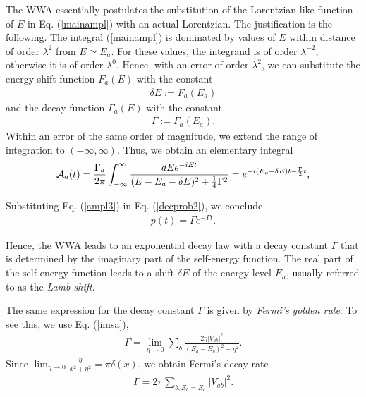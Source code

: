 \documentclass[12pt]{article}
\numberwithin{equation}{section}
\begin{document}
The WWA essentially postulates the substitution of the Lorentzian-like function of $E$ in Eq. (\ref{mainampl}) with an actual Lorentzian. The justification is the following.  The integral (\ref{mainampl}) is dominated by values of $E$  within distance of order $\lambda^2$ from  $E \simeq E_a$. For these values, the integrand is of order $\lambda^{-2}$, otherwise it is of order $\lambda^0$.   Hence, with an error of order $\lambda^2$,
 we   can substitute the energy-shift function $F_a(E)$ with the constant
\begin{eqnarray}
\delta E := F_a(E_a)
\end{eqnarray}
 and the decay function $\Gamma_a(E)$ with the constant
 \begin{eqnarray}
 \Gamma  := \Gamma_a(E_a).
 \end{eqnarray}
 Within an error of the same order of magnitude,
 we extend the range of integration to $(-\infty, \infty)$. Thus, we  obtain an elementary integral
\begin{eqnarray}
{\cal A}_a(t) =  \frac{\Gamma_a}{2 \pi }  \int_{-\infty}^{\infty } \frac{dE   e^{-iEt}}{ (E - E_a -  \delta E )^2 + \frac{1}{4}\Gamma^2} =  e^{ -i (E_a +\delta E ) t - \frac{\Gamma }{2}t},  \label{ampl3}
\end{eqnarray}


 Substituting Eq.  (\ref{ampl3}) in Eq. (\ref{decprob2}), we conclude
\begin{eqnarray}
p(t) = \Gamma  e^{-\Gamma t}.
\end{eqnarray}

 Hence, the WWA leads to an exponential decay law with a decay constant $\Gamma $ that is determined by the imaginary part of the self-energy function. The real part of the self-energy function leads to a shift
 $\delta E $ of the energy level $E_a$, usually referred to as the {\em Lamb shift}.




 The same expression for the decay constant $\Gamma $ is  given by {\em Fermi's golden rule}. To see this, we use
Eq. (\ref{imsa}),
\begin{eqnarray}
\Gamma  =  \lim_{\eta \rightarrow 0} \sum_b \frac{2\eta |V_{ab}|^2}{(E_a  - E_b)^2 +  \eta^2}.
\end{eqnarray}
Since $\lim_{\eta \rightarrow 0} \frac{\eta}{x^2 +\eta^2} = \pi \delta(x)$, we obtain Fermi's decay rate
\begin{eqnarray}
\Gamma  = 2 \pi \sum_{b, E_b = E_a} |V_{ab}|^2. \label{fgg}
\end{eqnarray}
\end{document}
